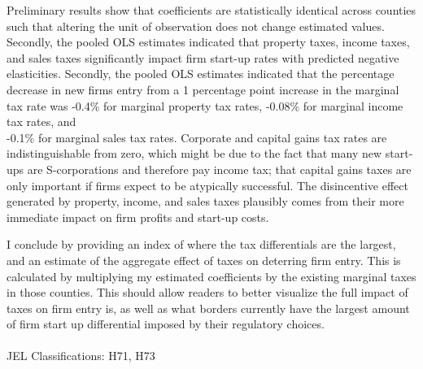 \documentclass[12 pt,a4paper]{article} %
\begin{document}
Preliminary results show that coefficients are statistically identical across counties such that altering the unit of observation does not change estimated values. Secondly, the pooled OLS estimates indicated that property taxes, income taxes, and sales taxes significantly impact firm start-up rates with predicted negative elasticities. Secondly, the pooled OLS estimates indicated that the percentage decrease in new firms entry from a 1 percentage point increase in the marginal tax rate was -0.4\% for marginal property tax rates, -0.08\% for marginal income tax rates, and \\ -0.1\% for marginal sales tax rates. Corporate and capital gains tax rates are indistinguishable from zero, which might be due to the fact that many new start-ups are S-corporations and therefore pay income tax; that capital gains taxes are only important if firms expect to be atypically successful. The disincentive effect generated by property, income, and sales taxes plausibly comes from their more immediate impact on firm profits and start-up costs. 

I conclude by providing an index of where the tax differentials are the largest, and an estimate of the aggregate effect of taxes on deterring firm entry. This is calculated by multiplying my estimated coefficients by the existing marginal taxes in those counties. This should allow readers to better visualize the full impact of taxes on firm entry is, as well as what borders currently have the largest amount of firm start up differential imposed by their regulatory choices.
\\
\\
JEL Classifications: H71, H73
\end{document}
